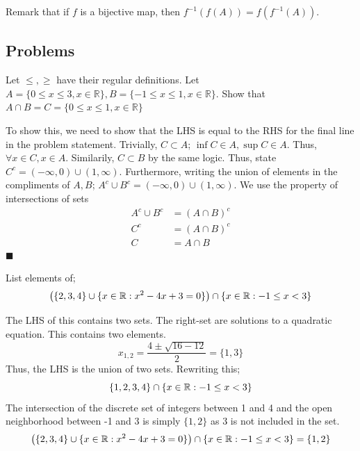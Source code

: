 Remark that if $f$ is a bijective map, then $f^{-1}(f(A)) = f(f^{-1}(A))$. 

\clearpage
\subsection{Problems}
\begin{problem}
    Let $\leq, \geq$ have their regular definitions. Let $A = \{0\leq x \leq 3, x \in \mathbb{R}\}, B = \{-1\leq x \leq 1, x \in \mathbb{R}\}$. Show that $A\cap B = C = \{0\leq x \leq 1, x \in \mathbb{R}\}$
\end{problem}

\begin{solution}
    To show this, we need to show that the LHS is equal to the RHS for the final line in the problem statement.  Trivially, $C \subset A$; $\inf C \in A, \sup C \in A$. Thus, $\forall x \in C, x \in A$. Similarily, $C \subset B$ by the same logic. Thus, state $C^c = (-\infty, 0) \cup (1, \infty)$. Furthermore, writing the union of elements in the compliments of $A, B$; $A^c \cup B^c = (-\infty, 0) \cup (1, \infty)$. We use the property of intersections of sets 
    \begin{align*}
        A^c \cup B^c &= (A \cap B)^c \\
                  C^c  &= (A \cap B)^c \\
                  C &= A \cap B
    \end{align*} 
    $\blacksquare$
\end{solution}

\begin{problem}
    List elements of;
    \begin{equation}
        \left(\{2,3,4\} \cup \{x\in \mathbb{R}: x^2 -4x +3 = 0 \}\right) \cap \{x\in \mathbb{R}:-1 \leq x < 3\}
    \end{equation}
\end{problem}
\begin{solution}
    The LHS of this contains two sets. The right-set are solutions to a quadratic equation. This contains two elements. 
    \[
    x_{1,2} = \frac{4 \pm \sqrt{16 - 12}}{2} = \{1, 3\}
    \]
    Thus, the LHS is the union of two sets. Rewriting this;
    \begin{equation}
       \{1,2,3,4\} \cap \{x\in \mathbb{R}:-1 \leq x < 3\}
    \end{equation}
    The intersection of the discrete set of integers between 1 and 4 and the open neighborhood between -1 and 3 is simply $\{1, 2\}$ as 3 is not included in the set. 
    \begin{equation}
        \left(\{2,3,4\} \cup \{x\in \mathbb{R}: x^2 -4x +3 = 0 \}\right) \cap \{x\in \mathbb{R}:-1 \leq x < 3\} = \{1,2\}
    \end{equation}
\end{solution}

